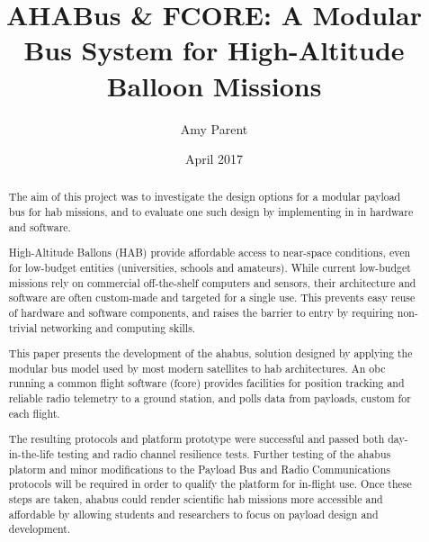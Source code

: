 \documentclass[11pt]{report}
\author{Amy Parent}
\title{AHABus \& FCORE: A Modular Bus System for High-Altitude Balloon Missions}
\date{April 2017}
\makeatletter
\newcommand\frontmatter{%
\cleardoublepage
\pagenumbering{roman}
}
\def\maketitle{%
    \vspace*{10em}
	\begin{center}%
	\let \footnote \thanks
        \vskip 5em%
		{\LARGE \textbf{\@title} \par}%
		\vskip 1.5em%
		{\large \@author}%
		\vskip 1em%
        {\large BSc (Hons) Computing - \@date\\} %
		\vskip 1em%
		{\normalsize School of Arts, Media and Games\\}%
		\vskip .1em%
		{\normalsize University of Abertay Dundee\\}%
		\vskip .1em%
		{\normalsize Dundee, DD1 1HG, UK}%
	\end{center}
}
\makeatother
\begin{document}
    
\frontmatter

\begin{titlepage}
\maketitle
\end{titlepage}

\begin{abstract}

The aim of this project was to investigate the design options for a modular payload bus for \acrfull{hab} missions, and to evaluate one such design by implementing in in hardware and software.

High-Altitude Ballons (HAB) provide affordable access to near-space conditions, even for low-budget entities (universities, schools and amateurs). While current low-budget missions rely on commercial off-the-shelf computers and sensors, their architecture and software are often custom-made and targeted for a single use. This prevents easy reuse of hardware and software components, and raises the barrier to entry by requiring non-trivial networking and computing skills.

This paper presents the development of the \acrfull{ahabus}, solution designed by applying the modular bus model used by most modern satellites to \acrlong{hab} architectures. An \acrfull{obc} running a common flight software (\acrshort{fcore}) provides facilities for position tracking and reliable radio telemetry to a ground station, and polls data from payloads, custom for each flight.

The resulting protocols and platform prototype were successful and passed both day-in-the-life testing and radio channel resilience tests. Further testing of the \acrshort{ahabus} platorm and minor modifications to the Payload Bus and Radio Communications protocols will be required in order to qualify the platform for in-flight use. Once these steps are taken, \acrshort{ahabus} could render scientific \acrlong{hab} missions more accessible and affordable by allowing students and researchers to focus on payload design and development.

\end{abstract}

\tableofcontents

\listoffigures

\listoftables

\printglossary
\printglossary[type=\acronymtype]
\end{document}
